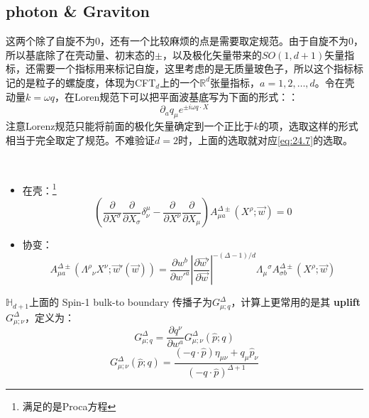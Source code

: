 \subsection{photon \& Graviton}
这两个除了自旋不为0，还有一个比较麻烦的点是需要取定规范。由于自旋不为0，所以基底除了在壳动量、初末态的$\pm$，以及极化矢量带来的$SO(1,d+1)$矢量指标，还需要一个指标用来标记自旋，这里考虑的是无质量玻色子，所以这个指标标记的是粒子的螺旋度，体现为CFT$_d$上的一个$\mathbb{R}^d$张量指标，$a=1,2,\ldots,d$。令在壳动量$k=\omega q$，在Loren规范下可以把平面波基底写为下面的形式：\sn{\[\partial_aq^\mu\equiv\frac{\partial}{\partial w^a}q^\mu(\vec{w})=2(w^a,\delta^{ba},-w^a)\]}：
\begin{equation}
	\partial_aq_\mu e^{\pm i\omega q\cdot X}
\end{equation}
注意Lorenz规范只能将前面的极化矢量确定到一个正比于$k$的项，选取这样的形式相当于完全取定了规范。不难验证$d=2$时，上面的选取就对应\ref{eq:24.7}的选取。
\begin{definition}
	~
	\begin{itemize}
		\item 在壳：\footnote{满足的是Proca方程}
		\begin{equation}
			\left(\frac{\partial}{\partial X^\sigma}\frac{\partial}{\partial X_\sigma}\delta_\nu^\mu-\frac{\partial}{\partial X^\nu}\frac{\partial}{\partial X_\mu}\right)A_{\mu a}^{\Delta\pm}(X^\rho;\vec{w})=0
		\end{equation}
		\item 协变：
		\begin{equation}
			A_{\mu a}^{\Delta\pm}\left(\Lambda^{\rho}{}_{\nu}X^{\nu};\vec{w}'(\vec{w})\right)=\frac{\partial w^{b}}{\partial{w'^{a}}}\left|\frac{\partial\vec{w}'}{\partial\vec{w}}\right|^{-(\Delta-1)/d}\Lambda_{\mu}{}^{\sigma}A_{\sigma b}^{\Delta\pm}(X^{\rho};\vec{w})
		\end{equation}
	\end{itemize}
\end{definition}
$\mathbb{H}_{d+1}$上面的 Spin\mbox{-}1 bulk-to boundary 传播子为$G^\Delta_{\mu;q}$，计算上更常用的是其 \textbf{uplift} $G^\Delta_{\mu;\nu}$，定义为：
\begin{equation}
	G^\Delta_{\mu;q}=\frac{\partial q^\nu}{\partial w^a}G_{\mu;\nu}^\Delta(\hat{p};q)
\end{equation}
\begin{equation}
	G_{\mu;\nu}^{\Delta}(\hat{p};q)=\frac{(-q\cdot\hat{p})\eta_{\mu\nu}+q_{\mu}\hat{p}_{\nu}}{(-q\cdot\hat{p})^{\Delta+1}}
\end{equation}
